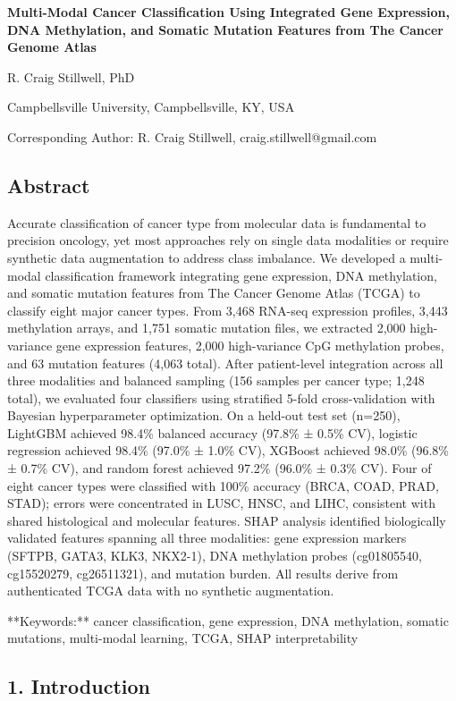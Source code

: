 \textbf{Multi-Modal Cancer Classification Using Integrated Gene
Expression, DNA Methylation, and Somatic Mutation Features from The
Cancer Genome Atlas}

R. Craig Stillwell, PhD

Campbellsville University, Campbellsville, KY, USA

Corresponding Author: R. Craig Stillwell, craig.stillwell@gmail.com

\subsection{Abstract}\label{abstract}

Accurate classification of cancer type from molecular data is
fundamental to precision oncology, yet most approaches rely on single
data modalities or require synthetic data augmentation to address class
imbalance. We developed a multi-modal classification framework
integrating gene expression, DNA methylation, and somatic mutation
features from The Cancer Genome Atlas (TCGA) to classify eight major
cancer types. From 3,468 RNA-seq expression profiles, 3,443 methylation
arrays, and 1,751 somatic mutation files, we extracted 2,000
high-variance gene expression features, 2,000 high-variance CpG
methylation probes, and 63 mutation features (4,063 total). After
patient-level integration across all three modalities and balanced
sampling (156 samples per cancer type; 1,248 total), we evaluated four
classifiers using stratified 5-fold cross-validation with Bayesian
hyperparameter optimization. On a held-out test set (n=250), LightGBM
achieved 98.4\% balanced accuracy (97.8\% ± 0.5\% CV), logistic
regression achieved 98.4\% (97.0\% ± 1.0\% CV), XGBoost achieved 98.0\%
(96.8\% ± 0.7\% CV), and random forest achieved 97.2\% (96.0\% ± 0.3\%
CV). Four of eight cancer types were classified with 100\% accuracy
(BRCA, COAD, PRAD, STAD); errors were concentrated in LUSC, HNSC, and
LIHC, consistent with shared histological and molecular features. SHAP
analysis identified biologically validated features spanning all three
modalities: gene expression markers (SFTPB, GATA3, KLK3, NKX2-1), DNA
methylation probes (cg01805540, cg15520279, cg26511321), and mutation
burden. All results derive from authenticated TCGA data with no
synthetic augmentation.

**Keywords:** cancer classification, gene expression, DNA methylation,
somatic mutations, multi-modal learning, TCGA, SHAP interpretability

\subsection{1. Introduction}\label{introduction}

